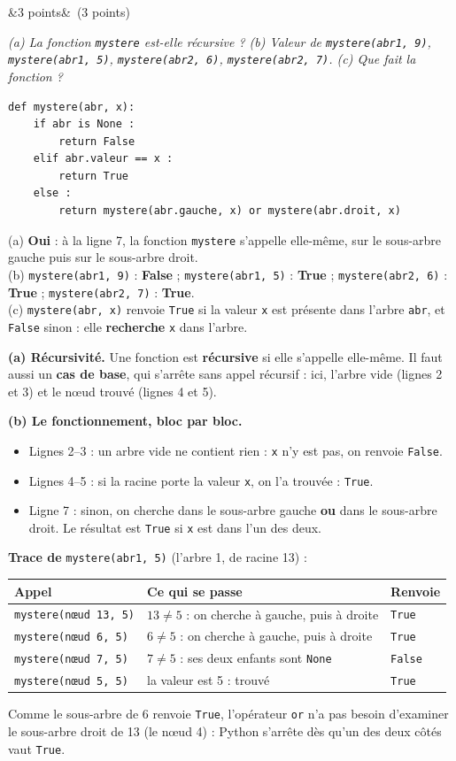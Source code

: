 \documentclass[11pt, a4paper]{exam}
\newcommand{\code}[1]{\texttt{#1}}
\newcommand{\Q}[3]{\par\needspace{5\baselineskip}\bigskip\noindent{\large\bfseries Question #1}\ifx&#2&\else\ \textnormal{(#2)}\fi\par\nopagebreak\smallskip\noindent\textit{#3}\par\nopagebreak\smallskip}
\begin{document}
\Q{7}{3 points}{(a) La fonction \code{mystere} est-elle récursive ? (b) Valeur de \code{mystere(abr1, 9)}, \code{mystere(abr1, 5)}, \code{mystere(abr2, 6)}, \code{mystere(abr2, 7)}. (c) Que fait la fonction ?}
\begin{lstlisting}
def mystere(abr, x):
    if abr is None :
        return False
    elif abr.valeur == x :
        return True
    else :
        return mystere(abr.gauche, x) or mystere(abr.droit, x)
\end{lstlisting}
\begin{reponse}
(a) \textbf{Oui} : à la ligne 7, la fonction \code{mystere} s'appelle elle-même, sur le sous-arbre gauche puis sur le sous-arbre droit. \\
(b) \code{mystere(abr1, 9)} : \textbf{False} ; \code{mystere(abr1, 5)} : \textbf{True} ; \code{mystere(abr2, 6)} : \textbf{True} ; \code{mystere(abr2, 7)} : \textbf{True}. \\
(c) \code{mystere(abr, x)} renvoie \code{True} si la valeur \code{x} est présente dans l'arbre \code{abr}, et \code{False} sinon : elle \textbf{recherche} \code{x} dans l'arbre.
\end{reponse}
\textbf{(a) Récursivité.} Une fonction est \textbf{récursive} si elle s'appelle elle-même. Il faut aussi un \textbf{cas de base}, qui s'arrête sans appel récursif : ici, l'arbre vide (lignes 2 et 3) et le nœud trouvé (lignes 4 et 5).

\textbf{(b) Le fonctionnement, bloc par bloc.}
\begin{itemize}
\item Lignes 2--3 : un arbre vide ne contient rien : \code{x} n'y est pas, on renvoie \code{False}.
\item Lignes 4--5 : si la racine porte la valeur \code{x}, on l'a trouvée : \code{True}.
\item Ligne 7 : sinon, on cherche dans le sous-arbre gauche \textbf{ou} dans le sous-arbre droit. Le résultat est \code{True} si \code{x} est dans l'un des deux.
\end{itemize}
\textbf{Trace de} \code{mystere(abr1, 5)} (l'arbre 1, de racine 13) :
\begin{center}
\renewcommand{\arraystretch}{1.2}
\begin{tabular}{|l|l|l|}
\hline
\textbf{Appel} & \textbf{Ce qui se passe} & \textbf{Renvoie} \\ \hline
\code{mystere(nœud 13, 5)} & $13 \neq 5$ : on cherche à gauche, puis à droite & \code{True} \\
\quad \code{mystere(nœud 6, 5)} & $6 \neq 5$ : on cherche à gauche, puis à droite & \code{True} \\
\quad\quad \code{mystere(nœud 7, 5)} & $7 \neq 5$ : ses deux enfants sont \code{None} & \code{False} \\
\quad\quad \code{mystere(nœud 5, 5)} & la valeur est 5 : trouvé & \code{True} \\ \hline
\end{tabular}
\end{center}
Comme le sous-arbre de 6 renvoie \code{True}, l'opérateur \code{or} n'a pas besoin d'examiner le sous-arbre droit de 13 (le nœud 4) : Python s'arrête dès qu'un des deux côtés vaut \code{True}.
\end{document}
